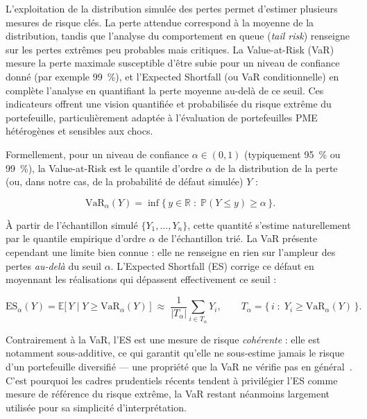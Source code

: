 \documentclass[a4paper,12pt,oneside]{report}
\begin{document}
L'exploitation de la distribution simulée des pertes permet d'estimer plusieurs mesures de
risque clés. La perte attendue correspond à la moyenne de la distribution, tandis que
l'analyse du comportement en queue (\textit{tail risk}) renseigne sur les pertes
extrêmes peu probables mais critiques. La Value-at-Risk (VaR) mesure la perte maximale
susceptible d'être subie pour un niveau de confiance donné (par exemple 99~\%), et
l'Expected Shortfall (ou VaR conditionnelle) en complète l'analyse en quantifiant la
perte moyenne au-delà de ce seuil. Ces indicateurs offrent une vision quantifiée et
probabilisée du risque extrême du portefeuille, particulièrement adaptée à l'évaluation de
portefeuilles PME hétérogènes et sensibles aux chocs.

Formellement, pour un niveau de confiance $\alpha \in (0,1)$ (typiquement 95~\% ou 99~\%), la
Value-at-Risk est le quantile d'ordre $\alpha$ de la distribution de la perte (ou, dans notre cas,
de la probabilité de défaut simulée) $Y$ :

\begin{equation}
  \mathrm{VaR}_\alpha(Y) = \inf\big\{\, y \in \mathbb{R} \;:\; \mathbb{P}(Y \le y) \ge \alpha \,\big\}.
  \label{eq:var}
\end{equation}

À partir de l'échantillon simulé $\{Y_1, \dots, Y_n\}$, cette quantité s'estime naturellement par
le quantile empirique d'ordre $\alpha$ de l'échantillon trié. La VaR présente cependant une
limite bien connue : elle ne renseigne en rien sur l'ampleur des pertes \emph{au-delà} du seuil
$\alpha$. L'Expected Shortfall (ES) corrige ce défaut en moyennant les réalisations qui
dépassent effectivement ce seuil :

\begin{equation}
  \mathrm{ES}_\alpha(Y) = \mathbb{E}\big[\, Y \;\big|\; Y \ge \mathrm{VaR}_\alpha(Y) \,\big]
    \;\approx\; \frac{1}{|T_\alpha|} \sum_{i \in T_\alpha} Y_i,
    \qquad T_\alpha = \big\{\, i \;:\; Y_i \ge \mathrm{VaR}_\alpha(Y) \,\big\}.
  \label{eq:es}
\end{equation}

Contrairement à la VaR, l'ES est une mesure de risque \emph{cohérente} : elle est notamment
sous-additive, ce qui garantit qu'elle ne sous-estime jamais le risque d'un portefeuille
diversifié — une propriété que la VaR ne vérifie pas en général~\cite{glasserman2004}. C'est
pourquoi les cadres prudentiels récents tendent à privilégier l'ES comme mesure de référence du
risque extrême, la VaR restant néanmoins largement utilisée pour sa simplicité
d'interprétation.
\end{document}
